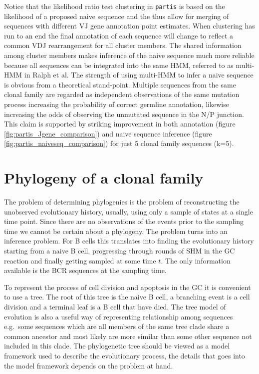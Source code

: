 Notice that the likelihood ratio test clustering in \texttt{partis} is based on the likelihood of a proposed naive sequence and the thus allow for merging of sequences with different VJ gene annotation point estimates.
When clustering has run to an end the final annotation of each sequence will change to reflect a common VDJ rearrangement for all cluster members.
The shared information among cluster members makes inference of the naive sequence much more reliable because all sequences can be integrated into the same HMM, referred to as multi-HMM in Ralph et al.
The strength of using multi-HMM to infer a naive sequence is obvious from a theoretical stand-point.
Multiple sequences from the same clonal family are regarded as independent observations of the same mutation process increasing the probability of correct germline annotation, likewise increasing the odds of observing the unmutated sequence in the N/P junction.
This claim is supported by striking improvement in both annotation (figure \ref{fig:partis_Jgene_comparison}) and naive sequence inference (figure \ref{fig:partis_naiveseq_comparison}) for just 5 clonal family sequences (k=5).












\section{Phylogeny of a clonal family}
The problem of determining phylogenies is the problem of reconstructing the unobserved evolutionary history, usually, using only a sample of states at a single time point.
Since there are no observations of the events prior to the sampling time we cannot be certain about a phylogeny.
The problem turns into an inference problem.
For B cells this translates into finding the evolutionary history starting from a naive B cell, progressing through rounds of SHM in the GC reaction and finally getting sampled at some time $t$.
The only information available is the BCR sequences at the sampling time.

To represent the process of cell division and apoptosis in the GC it is convenient to use a tree.
The root of this tree is the naive B cell, a branching event is a cell division and a terminal leaf is a B cell that have died.
The tree model of evolution is also a useful way of representing relationship among sequences e.g.\ some sequences which are all members of the same tree clade share a common ancestor and most likely are more similar than some other sequence not included in this clade.
The phylogenetic tree should be viewed as a model framework used to describe the evolutionary process, the details that goes into the model framework depends on the problem at hand.



